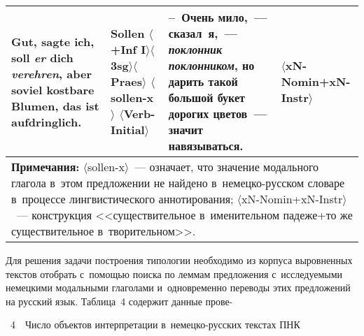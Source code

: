 \begin{multicols}{2}
\begin{table*}
\begin{center}
\begin{tabular}{|p{30mm}|p{19mm}|p{40mm}|p{32mm}|}
\hline
Gut, sagte ich, \textbf{soll} \textit{er} dich \textit{verehren}, aber soviel kostbare Blumen, das ist 
aufdringlich. &\textbf{Sollen}\newline
$\langle$+Inf I$\rangle$\newline $\langle$3sg$\rangle$\newline $\langle$Praes$\rangle$\newline 
$\langle$sollen-x$\rangle$\newline 
$\langle$Verb-Initial$\rangle$ 
&--~Очень мило,~--- сказал~я,~--- \textit{поклонник поклонником}, но дарить такой большой 
букет дорогих цветов~--- значит навязываться.& $\langle$xN-Nomin+xN-Instr$\rangle$\\
\hline
\multicolumn{4}{p{133mm}}{\footnotesize \hspace*{3mm}\textbf{Примечания:} %
$\langle$sollen-x$\rangle$~--- означает, что значение модального глагола в~этом предложении не найдено 
в~не\-мец\-ко-рус\-ском словаре в~процессе лингвистического аннотирования; %
$\langle$xN-Nomin+xN-Instr$\rangle$~--- конструкция <<существительное в~именительном падеже\;+\;то же 
существительное в~творительном>>.}
\end{tabular}
\end{center}
\end{table*}

  
  Для решения задачи построения типологии необходимо из корпуса 
выровненных текстов отобрать с~помощью поиска по леммам предложения 
с~исследуемыми немецкими модальными глаголами и~одновременно переводы 
этих предложений на русский язык. Таблица~4 содержит данные прове-\linebreak\vspace*{-12pt}

{\small %
    \vspace*{18pt}
    \noindent
 {{\tablename~4}\ \ \small{Число объектов интерпретации в~не\-мец\-ко-рус\-ских текстах ПНК}}


}
\end{multicols}

